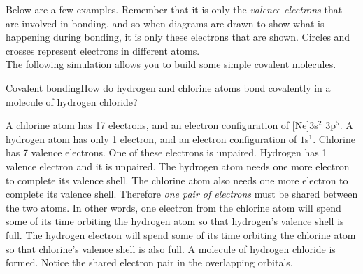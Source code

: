 Below are a few examples. Remember that it is only the \textit{valence electrons} that are involved in bonding, and so when diagrams are drawn to show what is happening during bonding, it is only these electrons that are shown. Circles and crosses represent electrons in different atoms.\\
The following simulation allows you to build some simple covalent molecules.
\begin{wex}{Covalent bonding}{How do hydrogen and chlorine atoms bond covalently in a molecule of hydrogen chloride?}{
A chlorine atom has 17 electrons, and an electron configuration of [Ne]$3$s$^{2}$ $3$p$^{5}$. A hydrogen atom has only 1 electron, and an electron configuration of $1$s$^{1}$.
Chlorine has 7 valence electrons. One of these electrons is unpaired. Hydrogen has 1 valence electron and it is unpaired.
The hydrogen atom needs one more electron to complete its valence shell. The chlorine atom also needs one more electron to complete its valence shell. Therefore \textit{one pair of electrons} must be shared between the two atoms. In other words, one electron from the chlorine atom will spend some of its time orbiting the hydrogen atom so that hydrogen's valence shell is full. The hydrogen electron will spend some of its time orbiting the chlorine atom so that chlorine's valence shell is also full. A molecule of hydrogen chloride is formed. Notice the shared electron pair in the overlapping orbitals.
\begin{figure}[H]
\begin{center}
\end{center}
\end{figure}}
\end{wex}
